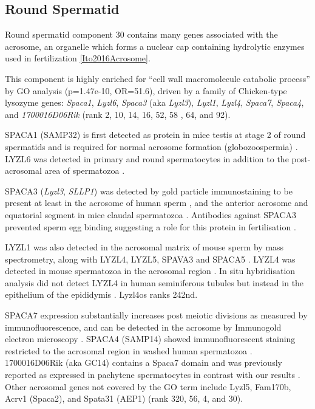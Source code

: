 \subsection{Round Spermatid}
Round spermatid component 30 contains many genes associated with the acrosome, an organelle which forms a nuclear cap containing hydrolytic enzymes used in fertilization \ref{Ito2016Acrosome}.

This component is highly enriched for ``cell wall macromolecule catabolic process'' by GO analysis  (p=1.47e-10, OR=51.6), driven by a family of Chicken-type lysozyme genes: \textit{Spaca1}, \textit{Lyzl6}, \textit{Spaca3} (aka \textit{Lyzl3}), \textit{Lyzl1}, \textit{Lyzl4}, \textit{Spaca7}, \textit{Spaca4}, and \textit{1700016D06Rik} (rank 2, 10, 14, 16, 52, 58 , 64, and 92).

SPACA1 (SAMP32) is first detected as protein in mice testis at stage 2 of round spermatids and is required for normal acrosome formation (globozoospermia) \parencite{Hao2002SAMP32,Fujihara2012SPACA1deficient}. LYZL6 was detected in primary and round spermatocytes in addition to the post-acrosomal area of spermatozoa \parencite{Wei2013Characterisation}.
 
SPACA3 (\textit{Lyzl3}, \textit{SLLP1}) was detected by gold particle immunostaining to be present at least in the acrosome of human sperm \parencite{Mandal2003SLLP1}, and the anterior acrosome and equatorial segment in mice claudal spermatozoa \parencite{Herrero2005Mouse}. Antibodies against SPACA3 prevented sperm egg binding suggesting a role for this protein in fertilisation \parencite{Herrero2005Mouse}.

LYZL1 was also detected in the acrosomal matrix of mouse sperm by mass spectrometry, along with LYZL4, LYZL5, SPAVA3 and SPACA5 \parencite{Guyonnet2012Isolation}. LYZL4 was detected in mouse spermatozoa in the acrosomal region \parencite{Sun2011Lyzl4}. In situ hybridisation analysis did not detect LYZL4 in human seminiferous tubules but instead in the epithelium of the epididymis \parencite{Zhang2005Molecular}. Lyzl4os ranks 242nd. 

SPACA7 expression substantially increases post meiotic divisions as measured by immunofluorescence, and can be detected in the acrosome by Immunogold electron microscopy \parencite{Korfanty2012Identification,Nguyen2014SPACA7}. SPACA4 (SAMP14) showed immunofluorescent staining restricted to the acrosomal region in washed human spermatozoa \parencite{Shetty2003SAMP14}. 1700016D06Rik (aka GC14) contains a Spaca7 domain and was previously reported as expressed in pachytene spermatocytes in contrast with our results \parencite{Anway2003Expression}. Other acrosomal genes not covered by the GO term include Lyzl5, Fam170b, Acrv1 (Spaca2), and Spata31 (AEP1) (rank 320, 56, 4, and 30).

